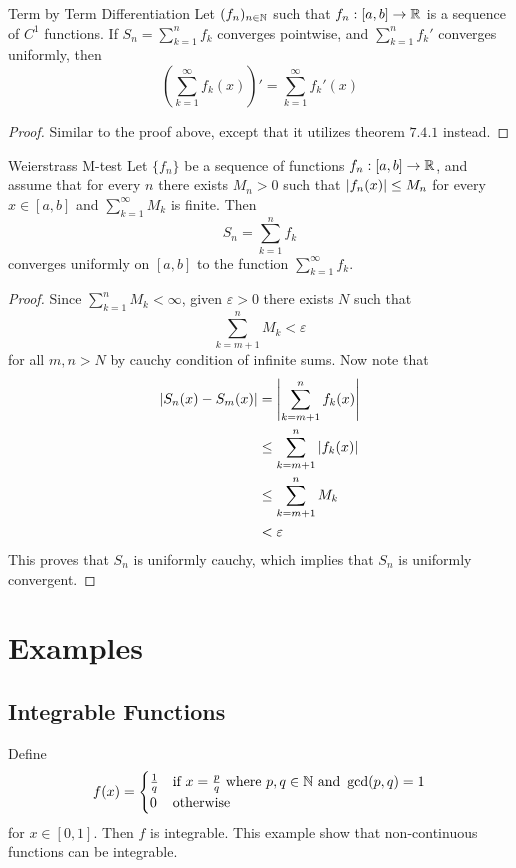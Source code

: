 \documentclass[a4paper]{article}
\begin{document}
\begin{thm}{Term by Term Differentiation}{} Let $(f_n)_{n\in\mathbb{N}}$ such that $f_n:[a,b]\to\mathbb{R}$ is a sequence of $C^1$ functions. If $S_n=\sum_{k=1}^nf_k$ converges pointwise, and $\sum_{k=1}^nf_k'$ converges uniformly, then $$\left(\sum_{k=1}^\infty f_k(x)\right)'=\sum_{k=1}^\infty f_k'(x)$$ \tcbline
\begin{proof} Similar to the proof above, except that it utilizes theorem $7.4.1$ instead. 
\end{proof}
\end{thm}

\begin{thm}{Weierstrass M-test}{} Let $\{f_n\}$ be a sequence of functions $f_n:[a,b]\to\mathbb{R}$, and assume that for every $n$ there exists $M_n>0$ such that $\abs{f_n(x)}\leq M_n$ for every $x\in[a,b]$ and $\sum_{k=1}^\infty M_k$ is finite. Then $$S_n=\sum_{k=1}^n f_k$$ converges uniformly on $[a,b]$ to the function $\sum_{k=1}^\infty f_k$. \tcbline
\begin{proof}
Since $\sum_{k=1}^nM_k<\infty$, given $\varepsilon>0$ there exists $N$ such that $$\sum_{k=m+1}^nM_k<\varepsilon$$ for all $m,n>N$ by cauchy condition of infinite sums. Now note that
\begin{align*}
\abs{S_n(x)-S_m(x)}&=\abs{\sum_{k=m+1}^nf_k(x)}\\
&\leq\sum_{k=m+1}^n\abs{f_k(x)}\\
&\leq\sum_{k=m+1}^nM_k\\
&<\varepsilon
\end{align*}
This proves that $S_n$ is uniformly cauchy, which implies that $S_n$ is uniformly convergent. 
\end{proof}
\end{thm}

\pagebreak
\section{Examples}
\subsection{Integrable Functions}
\begin{eg}{}{} Define $$f(x)=\begin{cases}
\frac{1}{q} & \text{if } x=\frac{p}{q} \text{ where } p,q\in\mathbb{N} \text{ and } \gcd(p,q)=1\\
0 & \text{otherwise }
\end{cases}$$ for $x\in[0,1]$. Then $f$ is integrable. This example show that non-continuous functions can be integrable. 
\end{eg}
\end{document}
